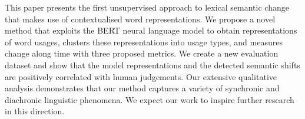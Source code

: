 This paper presents the first unsupervised approach to lexical semantic change that makes use of contextualised word representations. We propose a novel method that exploits the BERT neural language model to obtain representations of word  usages, clusters these representations into usage types, and measures change along time with three proposed metrics. We create a new evaluation dataset and show that the model representations and the detected semantic shifts are positively correlated with human judgements. Our extensive qualitative analysis demonstrates that our method captures a variety of synchronic and diachronic linguistic phenomena. We expect our work to inspire further research in this direction.
